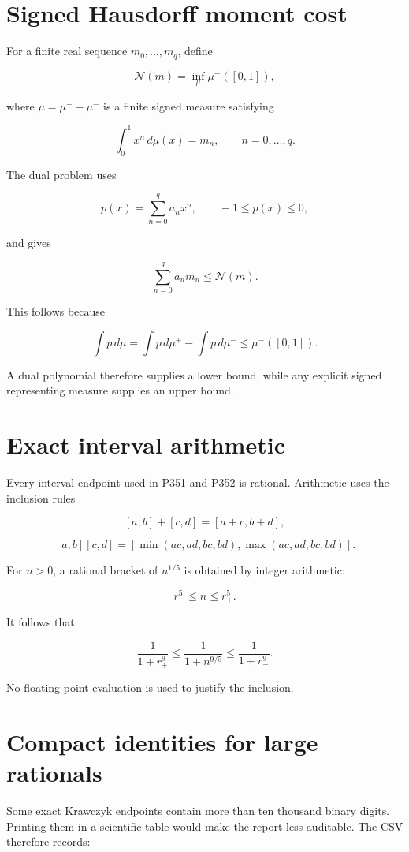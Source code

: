 \documentclass[11pt,a4paper,openany]{report}
\begin{document}
\section{Signed Hausdorff moment cost}

For a finite real sequence \(m_0,\ldots,m_q\), define

\[
\mathcal N(m)=
\inf_{\mu}
\mu^-([0,1]),
\]

where \(\mu=\mu^+-\mu^-\) is a finite signed measure satisfying

\[
\int_0^1 x^n\,d\mu(x)=m_n,
\qquad n=0,\ldots,q.
\]

The dual problem uses

\[
p(x)=\sum_{n=0}^{q}a_nx^n,
\qquad -1\leq p(x)\leq0,
\]

and gives

\[
\sum_{n=0}^{q}a_nm_n
\leq \mathcal N(m).
\]

This follows because

\[
\int p\,d\mu
=\int p\,d\mu^+-\int p\,d\mu^-
\leq \mu^-([0,1]).
\]

A dual polynomial therefore supplies a lower bound, while any explicit signed representing measure supplies an upper bound.

\section{Exact interval arithmetic}

Every interval endpoint used in P351 and P352 is rational. Arithmetic uses the inclusion rules

\[
[a,b]+[c,d]=[a+c,b+d],
\]

\[
[a,b][c,d]=
\left[
\min(ac,ad,bc,bd),
\max(ac,ad,bc,bd)
\right].
\]

For \(n>0\), a rational bracket of \(n^{1/5}\) is obtained by integer arithmetic:

\[
r_-^5\leq n\leq r_+^5.
\]

It follows that

\[
\frac{1}{1+r_+^9}
\leq
\frac{1}{1+n^{9/5}}
\leq
\frac{1}{1+r_-^9}.
\]

No floating-point evaluation is used to justify the inclusion.

\section{Compact identities for large rationals}

Some exact Krawczyk endpoints contain more than ten thousand binary digits. Printing them in a scientific table would make the report less auditable. The CSV therefore records:
\end{document}
